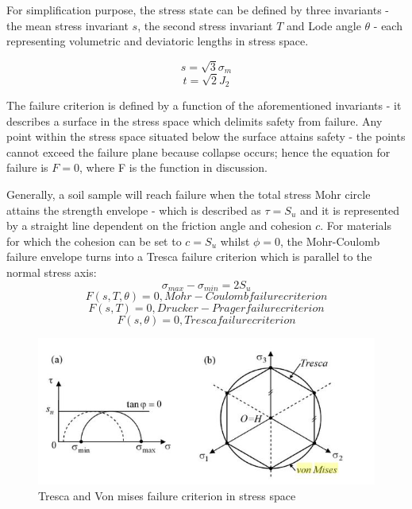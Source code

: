 \documentclass[12pt,a4paper]{report}
\begin{document}
For simplification purpose, the stress state can be defined by three invariants - the mean stress invariant $s$, the second stress invariant $T$ and Lode angle $\theta$ - each representing volumetric and deviatoric lengths in stress space.

\begin{equation}
	s=\sqrt{3}\sigma_m
\end{equation}
\begin{equation}
	t=\sqrt{2}J_2
\end{equation}

The failure criterion is defined by a function of the aforementioned invariants - it describes a surface in the stress space which delimits safety from failure. Any point within the stress space situated below the surface attains safety - the points cannot exceed the failure plane because collapse occurs; hence the equation for failure is $F = 0$, where F is the function in discussion. 

Generally, a soil sample will reach failure when the total stress Mohr circle attains the strength envelope - which is described as $\tau=S_u$ and it is represented by a straight line dependent on the friction angle and cohesion $c$. For materials for which the cohesion can be set to $c=S_u$ whilst $\phi=0$, the Mohr-Coulomb failure envelope turns into a Tresca failure criterion which is parallel to the normal stress axis:
\begin{equation}
	\sigma_{max}-\sigma_{min}=2S_u
\end{equation}
\begin{equation}
F(s,T,\theta)=0, Mohr-Coulomb failure criterion
\end{equation}
\begin{equation}
F(s,T)=0, Drucker-Prager failure criterion
\end{equation}
\begin{equation}
F(s,\theta)=0, Tresca failure criterion
\end{equation}

\begin{figure}[h!]
	\centering
	\includegraphics[width=0.8\linewidth]{"tresca"}
	\caption{Tresca and Von mises failure criterion in stress space}
	\label{tresca}
\end{figure}
\end{document}
